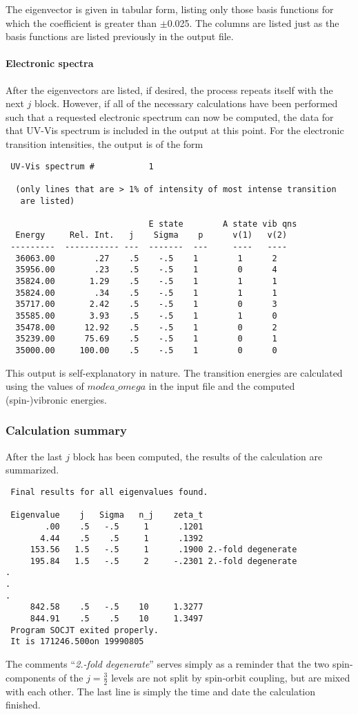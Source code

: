 \documentclass{article}
\begin{document}
The eigenvector is given in tabular form, listing only those basis
functions for which the coefficient is greater than $\pm $0.025. The
columns are listed just as the basis functions are listed previously
in the output file.

\paragraph{Electronic spectra}
After the eigenvectors are listed, if desired, the process repeats
itself with the next $j$ block. However, if all of the necessary
calculations have been performed such that a requested electronic
spectrum can now be computed, the data for that UV-Vis spectrum is
included in the output at this point. For the electronic transition
intensities, the output is of the form 
\begin{verbatim}
 UV-Vis spectrum #           1
 
  (only lines that are > 1% of intensity of most intense transition
   are listed)
 
                             E state        A state vib qns
  Energy     Rel. Int.   j    Sigma    p      v(1)   v(2)   
 ---------  ----------- ---  -------  ---     ----   ----  
  36063.00        .27    .5    -.5    1        1      2
  35956.00        .23    .5    -.5    1        0      4
  35824.00       1.29    .5    -.5    1        1      1
  35824.00        .34    .5    -.5    1        1      1
  35717.00       2.42    .5    -.5    1        0      3
  35585.00       3.93    .5    -.5    1        1      0
  35478.00      12.92    .5    -.5    1        0      2
  35239.00      75.69    .5    -.5    1        0      1
  35000.00     100.00    .5    -.5    1        0      0
\end{verbatim}
This output is self-explanatory in nature. The transition energies are
calculated using the values of $modea\_omega$ in the input file and
the computed (spin-)vibronic energies.

\subsubsection{Calculation summary}
After the last $j$ block has been computed, the results of the
calculation are summarized.
\begin{verbatim} 
 Final results for all eigenvalues found.
 
 Eigenvalue    j   Sigma   n_j    zeta_t
        .00    .5   -.5     1      .1201
       4.44    .5    .5     1      .1392
     153.56   1.5   -.5     1      .1900 2.-fold degenerate
     195.84   1.5   -.5     2     -.2301 2.-fold degenerate
.
.
.
     842.58    .5   -.5    10     1.3277
     844.91    .5    .5    10     1.3497
 Program SOCJT exited properly.
 It is 171246.500on 19990805
\end{verbatim}
The comments ``{\it 2.-fold degenerate}'' serves simply as a reminder
that the two spin-components of the $j=\frac{3}{2}$ levels are not
split by spin-orbit coupling, but are mixed with each other.
The last line is simply the time and date the calculation finished.
\end{document}
